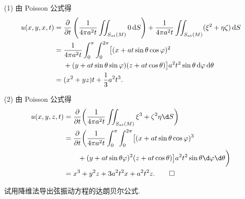 \begin{solve}
  (1) 由 Poisson 公式得
  \begin{align*}
    u(x,y,x,t)
    ={} & \frac{\partial}{\partial t}\left(\frac{1}{4\pi a^2t}\iint_{S_{at}(M)}0\mathop{}\!\mathrm{d} S\right) + \frac{1}{4\pi a^2t}\iint_{S_{at}(M)}(\xi^2+\eta\zeta)\mathop{}\!\mathrm{d} S \\
    ={} & \frac{1}{4\pi a^2t}\int_0^{\pi}\int_0^{2\pi} \bigl[(x+at\sin\theta\cos\varphi)^2 \\
        & + (y+at\sin\theta\sin\varphi)(z+at\cos\theta) \bigr]
          a^2t^2\sin\theta\mathop{}\!\mathrm{d}\varphi\mathop{}\!\mathrm{d}\theta \\
    ={} & (x^2+	yz)t + \frac13a^2t^3.
  \end{align*}

  (2) 由 Poisson 公式得
  \begin{align*}
    u(x,y,z,t)
    & = \frac{\partial}{\partial t} \biggl(\frac{1}{4\pi a^2 t}\iint_{S_{at}(M)} \xi^3
        + \zeta^2\eta \d S\biggr) \\
    & = \frac{\partial}{\partial t} \biggl(\frac{1}{4\pi a^2 t} \int_0^\pi \int_0^{2\pi}
        \bigl[ (x+at\sin\theta\cos\varphi)^3 \\
    & \qquad + (y+at\sin\theta\varphi)^2(z+at\cos\theta) \bigr] 
        a^2t^2\sin\theta \d \varphi \d \theta\biggr) \\
    & = x^3 + y^2z + 3a^2t^2x + a^2t^2z. \qedhere
  \end{align*}
\end{solve}


\begin{exercise}
  试用降维法导出弦振动方程的达朗贝尔公式.
\end{exercise}

